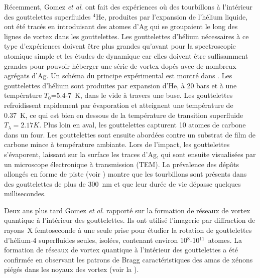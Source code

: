 		Récemment, Gomez \emph{et al}. ont fait des expériences\citep{Gom12} où des tourbillons à l'intérieur des gouttelettes superfluides $^4$He, produites par l'expansion de l'hélium liquide, ont été tracés en introduisant des atomes d'Ag qui se groupaient le long des lignes de vortex dans les gouttelettes. Les gouttelettes d'hélium nécessaires à ce type d'expériences doivent être plus grandes qu'avant pour la spectroscopie atomique simple et les études de dynamique car elles doivent être suffisamment grandes pour pouvoir héberger une série de vortex dopés avec de nombreux agrégats d'Ag. Un schéma du principe expérimental est montré dans . Les gouttelettes d'hélium sont produites par expansion d'He, à 20 bars et à une température $T_0$=5.4-7~K, dans le vide à travers une buse. Les gouttelettes refroidissent rapidement par évaporation et atteignent une température de 0.37~K\citep{Hartmann1995}, ce qui est bien en dessous de la température de transition superfluide $T_\lambda=2.17\unit{K}$\citep{Don91,Pit03}. Plus loin en aval, les gouttelettes capturent 10 atomes de carbone dans un four\citep{Log11d}. Les gouttelettes sont ensuite abordées contre un substrat de film de carbone mince à température ambiante\citep{Log11d}. Lors de l'impact, les gouttelettes s'évaporent, laissant sur la surface les traces d'Ag, qui sont ensuite visualisées par un microscope électronique à transmission (TEM). La prévalence des dépôts allongés en forme de piste (voir ) montre que les tourbillons sont présents dans des gouttelettes de plus de 300~nm et que leur durée de vie dépasse quelques millisecondes.
		
		Deux ans plus tard Gomez \emph{et al}. rapporté\citep{Gom14} sur la formation de réseaux de vortex quantique à l'intérieur des gouttelettes. Ils ont utilisé l'imagerie par diffraction de rayons~X femtoseconde à une seule prise pour étudier la rotation de gouttelettes d'hélium-4 superfluides seules, isolées, contenant environ 10$^8$-10$^{11}$~atomes. La formation de réseaux de vortex quantique à l'intérieur des gouttelettes a été confirmée en observant les patrons de Bragg caractéristiques des amas de xénons piégés dans les noyaux des vortex (voir la ).
	

